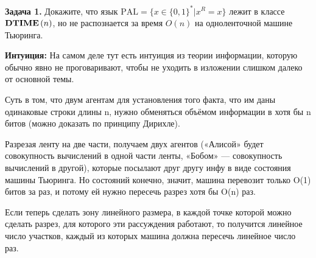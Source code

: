 \textbf{Задача 1.} Докажите, что язык $\mathrm{PAL}=\{x\in\{0,1\}^* | x^R=x\}$ лежит в классе $\textbf{DTIME}\left({n}\right)$, но не распознается за время $O(n)$ на одноленточной машине Тьюринга.

\textbf{Интуиция:} На самом деле тут есть интуиция из теории информации, которую обычно явно не проговаривают, чтобы не уходить в изложении слишком далеко от основной темы.

Суть в том, что двум агентам для установления того факта, что им даны одинаковые строки длины n, нужно обменяться объёмом информации в хотя бы n битов (можно доказать по принципу Дирихле).

Разрезая ленту на две части, получаем двух агентов («Алисой» будет совокупность вычислений в одной части ленты, «Бобом» — совокупность вычислений в другой), которые посылают друг другу инфу в виде состояния машины Тьюринга.
Но состояний конечно, значит, машина перевозит только O(1) битов за раз, и потому ей нужно пересечь разрез хотя бы O(n) раз.

Если теперь сделать зону линейного размера, в каждой точке которой можно сделать разрез, для которого эти рассуждения работают, то получится линейное число участков, каждый из которых машина должна пересечь линейное число раз.

